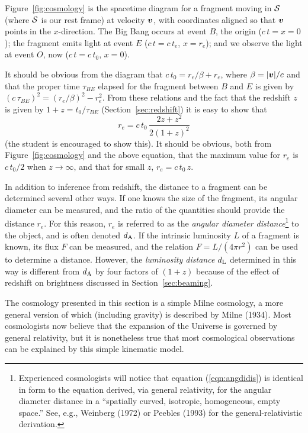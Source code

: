 Figure~\ref{fig:cosmology} is the spacetime diagram for a fragment
moving in $\cal S$ (where $\cal S$ is our rest frame) at velocity
$\mbox{\boldmath $v$}$, with coordinates aligned so that $\mbox{\boldmath $v$}$ points in the
$x$-direction.  The Big Bang occurs at event $B$, the origin
($c\,t=x=0$); the fragment emits light at event $E$ ($c\,t=c\,t_e$,
$x=r_e$); and we observe the light at event $O$, now ($c\,t=c\,t_0$,
$x=0$).

It should be obvious from the diagram that $c\,t_0=r_e/\beta+r_e$, where
$\beta=|\mbox{\boldmath $v$}|/c$ and that the proper time $\tau_{BE}$ elapsed for
the fragment between $B$ and $E$ is given by
$(c\,\tau_{BE})^2=(r_e/\beta)^2-r_e^2$.  From these relations and the
fact that the redshift $z$ is given by $1+z=t_0/\tau_{BE}$
(Section~\ref{sec:redshift}) it is easy to show that
\begin{equation}
\label{eqn:angdidis}
r_e=c\,t_0\,\frac{2z+z^2}{2(1+z)^2}
\end{equation}
(the student is encouraged to show this). It should be obvious, both
from Figure~\ref{fig:cosmology} and the above equation, that the
maximum value for $r_e$ is $c\,t_0/2$ when $z\rightarrow\infty$, and
that for small $z$, $r_e=c\,t_0\,z$.

In addition to inference from redshift, the distance to a fragment can
be determined several other ways.  If one knows the size of the
fragment, its angular diameter can be measured, and the ratio of the
quantities should provide the distance $r_e$.  For this reason, $r_e$
is referred to as the {\em angular diameter
distance}\footnote{Experienced cosmologists will notice that equation
(\protect\ref{eqn:angdidis}) is identical in form to the equation
derived, via general relativity, for the angular diameter distance in
a ``spatially curved, isotropic, homogeneous, empty space.''  See,
e.g., Weinberg (1972) or Peebles (1993) for the general-relativistic
derivation.} to the object, and is often denoted $d_{\rm A}$. If the
intrinsic luminosity $L$ of a fragment is known, its flux $F$ can be
measured, and the relation $F=L/(4\pi r^2)$ can be used to determine a
distance.  However, the {\em luminosity distance\/} $d_{\rm L}$
determined in this way is different from $d_{\rm A}$ by four factors
of $(1+z)$ because of the effect of redshift on brightness discussed
in Section~\ref{sec:beaming}.

The cosmology presented in this section is a simple Milne cosmology, a
more general version of which (including gravity) is described by
Milne (1934).  Most cosmologists now believe that the expansion of the
Universe is governed by general relativity, but it is nonetheless true
that most cosmological observations can be explained by this simple
kinematic model.
